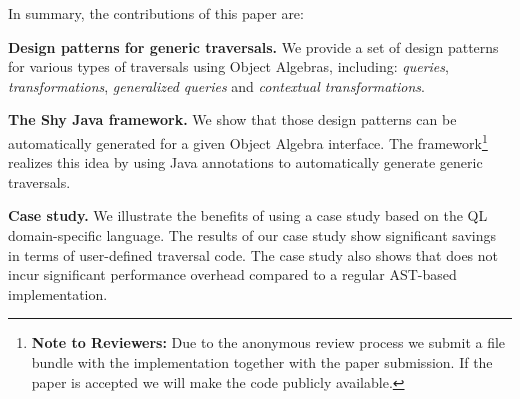 In summary, the contributions of this paper are:

\begin{itemize*}

\item {\bf Design patterns for generic traversals.} We provide a set of design
patterns for various types of traversals using Object Algebras, including:
\emph{queries}, \emph{transformations},
\emph{generalized queries} and \emph{contextual transformations}.

\item {\bf The Shy Java framework.} We show that those design patterns
  can be automatically generated for a given Object Algebra
  interface. The \name framework\footnote{{\bf
      Note to Reviewers:} Due to the anonymous review process we
    submit a file bundle with the implementation together with the paper submission. If the
    paper is accepted we will make the code publicly available.} realizes this idea by using
   Java annotations to automatically generate generic traversals.

\item {\bf Case study.} We illustrate the benefits of \name using a case study based on the QL domain-specific
  language. The results of our case study show significant savings in
  terms of user-defined traversal code. The case study also shows that \name does not incur significant performance overhead compared to a regular AST-based implementation.
\end{itemize*}
